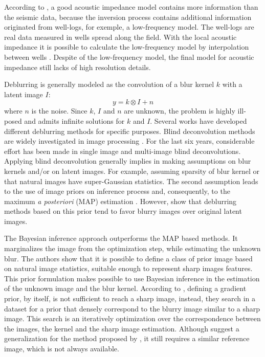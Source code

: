 \documentclass[conference]{IEEEtran}
\begin{document}
According to \cite{Latimer2017}, a good acoustic impedance model contains more information
than the seismic data, because the inversion process contains additional information originated from well-logs, for
exemple, a low-frequency model.
The well-logs are real data measured in wells spread along the field.
With the local acoustic impedance it is possible to calculate the low-frequency
model by interpolation between wells \cite{Buland2003,Figueiredo2012}. Despite of the
low-frequency model, the final model for acoustic impedance still lacks of high resolution details.

Deblurring is generally modeled as the convolution of a blur kernel $k$
with a latent image $I$: 
\begin{equation}
 y = k \otimes I + n
 \label{eq:deblurr}
\end{equation}
where $n$ is the noise. Since $k$, $I$ and $n$ are unknown, the problem 
is highly ill-posed and admits infinite solutions for $k$ and $I$.
Several works have developed different deblurring methods for specific purposes.
Blind deconvolution methods are widely investigated in image processing \cite{Bishop2007}.
For the last six years, considerable effort has been made in single image
\cite{Babacan2012,Krishnan2015,Levin2011,Zhang2011} and multi-image \cite{sroubek2012,Zhu2012} blind deconvolutions. 
Applying blind deconvolution generally implies in making assumptions on
blur kernels and/or on latent images. For example, assuming sparsity of blur kernel
or that natural images have super-Gaussian statistics. The second assumption
leads to the use of image priors on inference process and, consequently, to the maximum \textit{a posteriori}
(MAP) estimation \cite{Babacan2012}. However, \cite{Levin} show that deblurring methods
based on this prior tend to favor blurry images over original latent images.

The Bayesian inference approach \cite{Levin} outperforms the MAP based methods. It marginalizes
the image from the optimization step, while estimating the unknown blur.
The authors show that it is possible to define a class of prior image
based on natural image statistics, suitable enough to represent sharp images features.
This prior formulation makes possible to use Bayesian inference in the estimation of the
unknown image and the blur kernel. According to \cite{Hacohen13}, defining a gradient
prior, by itself, is not sufficient to reach a sharp image, instead,
they search in a dataset for a prior that densely correspond to
the blurry image similar to a sharp image. This search is an
iteratively optimization over the correspondence between the images, the kernel and
the sharp image estimation. Although \cite{Pan2014} suggest a generalization
for the method proposed by \cite{Hacohen13}, it still requires a similar reference image,
which is not always available.
\end{document}
